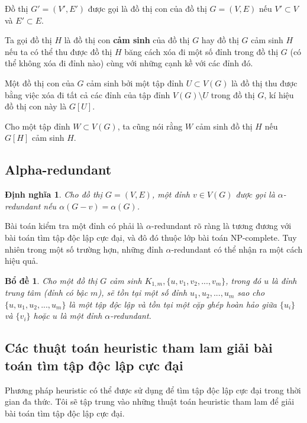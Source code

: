\documentclass[14pt, oneside, a4paper, openany]{scrartcl}
\newtheorem{lemma}[theorem]{Bổ đề}
\newtheorem{definition}{Định nghĩa}[section]
\begin{document}
Đồ thị $G'=(V',E')$ được gọi là đồ thị con của đồ thị $G=(V,E)$ nếu $V' \subset V$ và $E' \subset E$.

Ta gọi đồ thị $H$ là đồ thị con \textbf{cảm sinh}  của đồ thị $G$ hay đồ thị $G$ cảm sinh $H$ nếu ta có thể thu được đồ thị $H$ băng cách xóa đi một số đỉnh trong đồ thị $G$ (có thể không xóa đi đỉnh nào) cùng với những cạnh kề với các đỉnh đó.

Một đồ thị con của $G$ cảm sinh bởi một tập đỉnh $U \subset V(G)$ là đồ thị thu được bằng việc xóa đi tất cả các đỉnh của tập đỉnh $V(G) \setminus U$ trong đồ thị $G$, kí hiệu đồ thị con này là $G[U]$.

Cho một tập đỉnh $W \subset V(G)$, ta cũng nói rằng $W$ cảm sinh đồ thị $H$ nếu $G[H]$ cảm sinh $H$.
\subsection{Alpha-redundant}
\begin{definition}
	\cite{alpharedundant} Cho đồ thị $G = (V,E)$, một đỉnh $v \in V(G)$ được gọi là $\alpha$-redundant  nếu $\alpha(G-v) = \alpha(G)$.
\end{definition}

Bài toán kiểm tra một đỉnh có phải là $\alpha$-redundant rõ ràng là tương đương với bài toán tìm tập độc lập cực đại, và đô đó thuộc lớp bài toán NP-complete. Tuy nhiên trong một số trường hợn, những đỉnh $\alpha$-redundant có thể nhận ra một cách hiệu quả.

\begin{lemma}
	\cite{alpharedudant2} Cho một đồ thị $G$ cảm sinh $K_{1,m}, \{u,v_1,v_2,...,v_m\}$, trong đó $u$ là đỉnh trung tâm (đỉnh có bậc $m$), sẽ tồn tại một số đỉnh $u_1,u_2,...,u_m$ sao cho $\{u,u_1,u_2,...,u_m\}$ là một tập độc lập và tồn tại một cặp ghép hoàn hảo giữa $\{u_i\}$ và $\{v_i\}$ hoặc $u$ là một đỉnh $\alpha$-redundant.
\end{lemma}

\subsection{Các thuật toán heuristic tham lam giải bài toán tìm tập độc lập cực đại}
Phương pháp heuristic có thể được sử dụng để tìm tập độc lập cực đại trong thời gian đa thức. Tôi sẽ tập trung vào những thuật toán heuristic tham lam để giải bài toán tìm tập độc lập cực đại.
\end{document}
